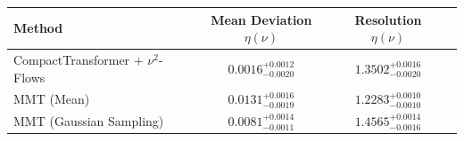     \begin{tabular}{lccc}
        \toprule
        Method & Mean Deviation $\eta({\nu})$ & Resolution $\eta({\nu})$ \\
        \midrule
        CompactTransformer + $\nu^2$-Flows & $0.0016^{+0.0012}_{-0.0020}$ & $1.3502^{+0.0016}_{-0.0020}$ \\
        MMT (Mean) & $0.0131^{+0.0016}_{-0.0019}$ & $1.2283^{+0.0010}_{-0.0010}$ \\
        MMT (Gaussian Sampling) & $0.0081^{+0.0014}_{-0.0011}$ & $1.4565^{+0.0014}_{-0.0016}$ \\
        \bottomrule
    \end{tabular}